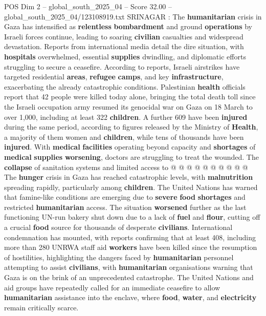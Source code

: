 \begin{textsample}{POS Dim 2 – global\_south\_2025\_04 – Score 32.00 – global\_south\_2025\_04/123108919.txt}  \label{ex:f2_pos_271}
SRINAGAR : The \textbf{humanitarian} crisis in Gaza has intensified as \textbf{relentless} \textbf{bombardment} and ground \textbf{operations} by Israeli forces continue, leading to soaring \textbf{civilian} casualties and widespread devastation.
Reports from international media detail the dire situation, with \textbf{hospitals} overwhelmed, essential \textbf{supplies} dwindling, and diplomatic efforts struggling to secure a ceasefire.
According to reports, Israeli airstrikes have targeted residential \textbf{areas}, \textbf{refugee} \textbf{camps}, and key \textbf{infrastructure}, exacerbating the already catastrophic conditions.
Palestinian \textbf{health} officials report that 42 people were killed today alone, bringing the total death toll since the Israeli occupation army resumed its genocidal war on Gaza on 18 March to over 1,000, including at least 322 \textbf{children}.
A further 609 have been \textbf{injured} during the same period, according to figures released by the Ministry of \textbf{Health}, a majority of them women and \textbf{children}, while tens of thousands have been \textbf{injured}.
With \textbf{medical} \textbf{facilities} operating beyond capacity and \textbf{shortages} of \textbf{medical} \textbf{supplies} \textbf{worsening}, doctors are struggling to treat the wounded.
The \textbf{collapse} of sanitation systems and limited access to @ @ @ @ @ @ @ @ @ @ The \textbf{hunger} crisis in Gaza has reached catastrophic levels, with \textbf{malnutrition} spreading rapidly, particularly among \textbf{children}.
The United Nations has warned that famine-like conditions are emerging due to \textbf{severe} \textbf{food} \textbf{shortages} and restricted \textbf{humanitarian} access.
The situation \textbf{worsened} further as the last functioning UN-run bakery shut down due to a lack of \textbf{fuel} and \textbf{flour}, cutting off a crucial \textbf{food} source for thousands of desperate \textbf{civilians}.
International condemnation has mounted, with reports confirming that at least 408, including more than 280 UNRWA staff aid \textbf{workers} have been killed since the resumption of hostilities, highlighting the dangers faced by \textbf{humanitarian} personnel attempting to assist \textbf{civilians}, with \textbf{humanitarian} organisations warning that Gaza is on the brink of an unprecedented catastrophe.
The United Nations and aid groups have repeatedly called for an immediate ceasefire to allow \textbf{humanitarian} assistance into the enclave, where \textbf{food}, \textbf{water}, and \textbf{electricity} remain critically scarce.

\end{textsample}

